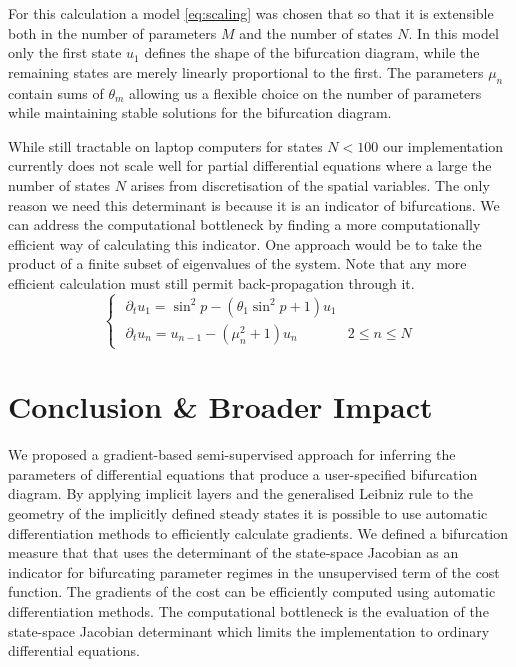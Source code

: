 For this calculation a model \eqref{eq:scaling} was chosen that so that it is extensible both in the number of parameters $M$ and the number of states $N$. In this model only the first state $u_1$ defines the shape of the bifurcation diagram, while the remaining states are merely linearly proportional to the first. The parameters $\mu_n$ contain sums of $\theta_m$ allowing us a flexible choice on the number of parameters while maintaining stable solutions for the bifurcation diagram.

While still tractable on laptop computers for states $N<100$ our implementation currently does not scale well for partial differential equations where a large the number of states $N$ arises from discretisation of the spatial variables. The only reason we need this determinant is because it is an indicator of bifurcations. We can address the computational bottleneck by finding a more computationally efficient way of calculating this indicator. One approach would be to take the product of a finite subset of eigenvalues of the system. Note that any more efficient calculation must still permit back-propagation through it.
\begin{equation}
\begin{cases}
    \,\,\partial_t u_1 = \sin^{2}\!p - (\theta_1\sin^{2}\!p+1)u_1\\
    \,\,\partial_t u_n = u_{n-1} - (\mu_n^2+1) u_n & 2\le n\leq N
\end{cases}
\label{eq:scaling}
\end{equation}
\section{Conclusion \& Broader Impact}
\label{section:conclusion}

We proposed a gradient-based semi-supervised approach for inferring the parameters of differential equations that produce a user-specified bifurcation diagram. By applying implicit layers \cite{Look2020DifferentiableLayers,Bai2019DeepModels} and the generalised Leibniz rule \cite{Flanders1973DifferentiationSign} to the geometry of the implicitly defined steady states \cite{Goldman2005CurvatureSurfaces} it is possible to use automatic differentiation methods to efficiently calculate gradients. We defined a bifurcation measure that that uses the determinant of the state-space Jacobian as an indicator for bifurcating parameter regimes in the unsupervised term of the cost function. The gradients of the cost can be efficiently computed using automatic differentiation methods. The computational bottleneck is the evaluation of the state-space Jacobian determinant which limits the implementation to ordinary differential equations.

